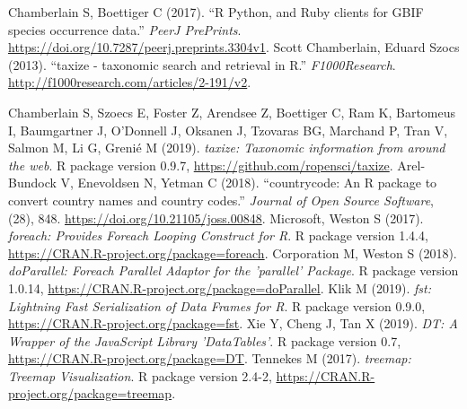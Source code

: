 Chamberlain S, Boettiger C (2017).
``R Python, and Ruby clients for GBIF species occurrence data.''
\emph{PeerJ PrePrints}.
\url{https://doi.org/10.7287/peerj.preprints.3304v1}.
\newline Scott Chamberlain, Eduard Szocs (2013).
``taxize - taxonomic search and retrieval in R.''
\emph{F1000Research}.
\url{http://f1000research.com/articles/2-191/v2}.

Chamberlain S, Szoecs E, Foster Z, Arendsee Z, Boettiger C, Ram K, Bartomeus I, Baumgartner J, O'Donnell J, Oksanen J, Tzovaras BG, Marchand P, Tran V, Salmon M, Li G, Grenié M (2019).
\emph{taxize: Taxonomic information from around the web}.
R package version 0.9.7, \url{https://github.com/ropensci/taxize}.
\newline Arel-Bundock V, Enevoldsen N, Yetman C (2018).
``countrycode: An R package to convert country names and country codes.''
\emph{Journal of Open Source Software}, (28), 848.
\url{https://doi.org/10.21105/joss.00848}.
\newline Microsoft, Weston S (2017).
\emph{foreach: Provides Foreach Looping Construct for R}.
R package version 1.4.4, \url{https://CRAN.R-project.org/package=foreach}.
\newline Corporation M, Weston S (2018).
\emph{doParallel: Foreach Parallel Adaptor for the 'parallel' Package}.
R package version 1.0.14, \url{https://CRAN.R-project.org/package=doParallel}.
\newline Klik M (2019).
\emph{fst: Lightning Fast Serialization of Data Frames for R}.
R package version 0.9.0, \url{https://CRAN.R-project.org/package=fst}.
\newline Xie Y, Cheng J, Tan X (2019).
\emph{DT: A Wrapper of the JavaScript Library 'DataTables'}.
R package version 0.7, \url{https://CRAN.R-project.org/package=DT}.
\newline Tennekes M (2017).
\emph{treemap: Treemap Visualization}.
R package version 2.4-2, \url{https://CRAN.R-project.org/package=treemap}.
\newline 